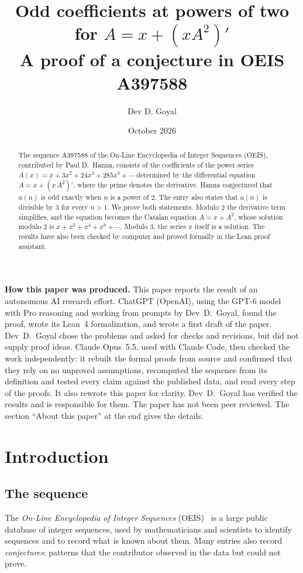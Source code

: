 \documentclass[11pt,a4paper]{article}
\title{Odd coefficients at powers of two for $A=x+(xA^2)'$\\[6pt]\large A proof of a conjecture in OEIS A397588}
\author{Dev D. Goyal}
\date{October 2026}
\theoremstyle{definition}
\theoremstyle{remark}
\begin{document}
\maketitle
\begin{abstract}
The sequence A397588 of the On-Line Encyclopedia of Integer Sequences (OEIS), contributed by Paul D.~Hanna, consists of
the coefficients of the power series $A(x)=x+3x^2+24x^3+285x^4+\cdots$ determined by the differential equation
$A=x+(x\,A^2)'$, where the prime denotes the derivative. Hanna conjectured that $a(n)$ is odd exactly when $n$ is a power
of $2$. The entry also states that $a(n)$ is divisible by $3$ for every $n>1$. We prove both statements. Modulo $2$ the
derivative term simplifies, and the equation becomes the Catalan equation $A=x+A^2$, whose solution modulo $2$ is
$x+x^2+x^4+x^8+\cdots$. Modulo $3$, the series $x$ itself is a solution. The results have also been checked by computer
and proved formally in the Lean proof assistant.
\end{abstract}
\begin{center}\begin{minipage}{0.88\linewidth}\small
\textbf{How this paper was produced.} This paper reports the result of an autonomous AI research effort.
ChatGPT (OpenAI), using the GPT-6 model with Pro reasoning and working from prompts by Dev~D.~Goyal, found the proof, wrote its Lean~4 formalization, and wrote a first draft of the paper.
Dev~D.~Goyal chose the problems and asked for checks and revisions, but did not supply proof ideas.
Claude Opus~5.5, used with Claude Code, then checked the work independently: it rebuilt the formal proofs from
source and confirmed that they rely on no unproved assumptions, recomputed the sequence from its definition and tested
every claim against the published data, and read every step of the proofs. It also rewrote this paper for clarity.
Dev~D.~Goyal has verified the results and is responsible for them. The paper has not been peer reviewed.
The section ``About this paper'' at the end gives the details.
\end{minipage}\end{center}

\section{Introduction}

\subsection{The sequence}\label{sec:sequence}
The \emph{On-Line Encyclopedia of Integer Sequences} (OEIS)~\cite{oeisdb} is a large public database of integer
sequences, used by mathematicians and scientists to identify sequences and to record what is known about them. Many
entries also record \emph{conjectures}: patterns that the contributor observed in the data but could not prove.
\end{document}
